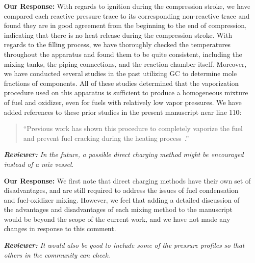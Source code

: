 \documentclass{article}
\newenvironment{reviewer}{\vspace{0.5\baselineskip}\begingroup\itshape\textbf{Reviewer:}}{\endgroup\vspace{0.5\baselineskip}}
\newenvironment{response}{\vspace{0.5\baselineskip}\textbf{Our Response:}}{\vspace{0.5\baselineskip}}
\begin{document}
\begin{response}
    With regards to ignition during the compression stroke, we have compared each reactive pressure
    trace to its corresponding non-reactive trace and found they are in good agreement from the
    beginning to the end of compression, indicating that there is no heat release during the
    compression stroke. With regards to the filling process, we have thoroughly checked the
    temperatures throughout the apparatus and found them to be quite consistent, including the
    mixing tanks, the piping connections, and the reaction chamber itself. Moreover, we have
    conducted several studies in the past utilizing GC to determine mole fractions of components.
    All of these studies determined that the vaporization procedure used on this apparatus is
    sufficient to produce a homogeneous mixture of fuel and oxidizer, even for fuels with relatively
    low vapor pressures. We have added references to these prior studies in the present manuscript
    near line 110:

    \begin{quote}
        ``Previous work has shown this procedure to completely vaporize the fuel and prevent fuel
        cracking during the heating process~\cite{Weber2011a,Kumar2009,Das2012}.''
    \end{quote}
\end{response}

\begin{reviewer}
    In the future, a possible direct charging method might be encouraged instead of a mix vessel.
\end{reviewer}

\begin{response}
    We first note that direct charging methods have their own set of disadvantages, and are still
    required to address the issues of fuel condensation and fuel-oxidizer mixing. However, we feel
    that adding a detailed discussion of the advantages and disadvantages of each mixing method to
    the manuscript would be beyond the scope of the current work, and we have not made any changes
    in response to this comment.
\end{response}

\begin{reviewer}
    It would also be good to include some of the pressure profiles so that others in the community
    can check.
\end{reviewer}
\end{document}

